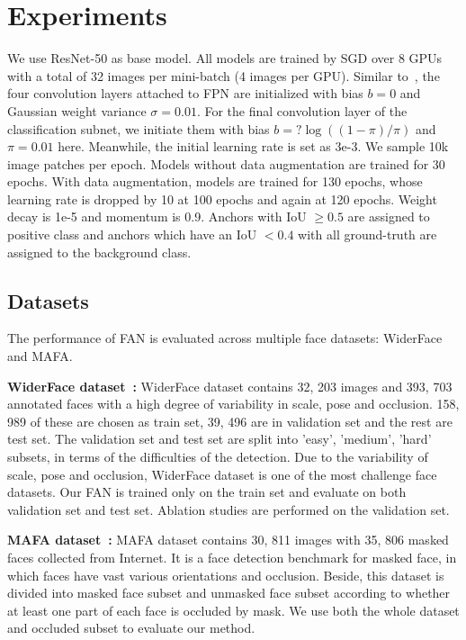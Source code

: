 \documentclass[10pt,twocolumn,letterpaper]{article}
\begin{document}
\section{Experiments}
We use ResNet-50 as base model. All models are trained by SGD over 8 GPUs with a total of 32 images per mini-batch (4 images per GPU). Similar to~\cite{lin2017focal}, the four convolution layers attached to FPN are initialized with bias $ b=0 $ and Gaussian weight variance $ \sigma=0.01 $. For the final convolution layer of the classification subnet, we initiate them with bias $ b=?\log((1-\pi)/\pi) $ and $ \pi=0.01 $ here. Meanwhile, the initial learning rate is set as 3e-3. We sample 10k image patches per epoch. Models without data augmentation are trained for 30 epochs. With data augmentation, models are trained for 130 epochs, whose learning rate is dropped by 10 at 100 epochs and again at 120 epochs. Weight decay is 1e-5 and momentum is 0.9. Anchors with IoU $ \geq0.5 $ are assigned to positive class and anchors which have an IoU $ <0.4 $ with all ground-truth are assigned to the background class.


\subsection{Datasets}
The performance of FAN is evaluated across multiple face datasets: WiderFace and MAFA.

\textbf{WiderFace dataset~\cite{yang2016wider}:} WiderFace dataset contains 32, 203 images and 393, 703 annotated faces with a high degree of variability in scale, pose and occlusion. 158, 989 of these are chosen as train set, 39, 496 are in validation set and the rest are test set. The validation set and test set are split into 'easy', 'medium', 'hard' subsets, in terms of the difficulties of the detection. Due to the variability of scale, pose and occlusion, WiderFace dataset is one of the most challenge face datasets. Our FAN is trained only on the train set and evaluate on both validation set and test set. Ablation studies are performed on the validation set.

\textbf{MAFA dataset~\cite{Ge_2017_CVPR}:} MAFA dataset contains 30, 811 images with 35, 806 masked faces collected from Internet. It is a face detection benchmark for masked face, in which faces have vast various orientations and occlusion. Beside, this dataset is divided into masked face subset and unmasked face subset according to whether at least one part of each face is occluded by mask. We use both the whole dataset and occluded subset to evaluate our method.
\end{document}
